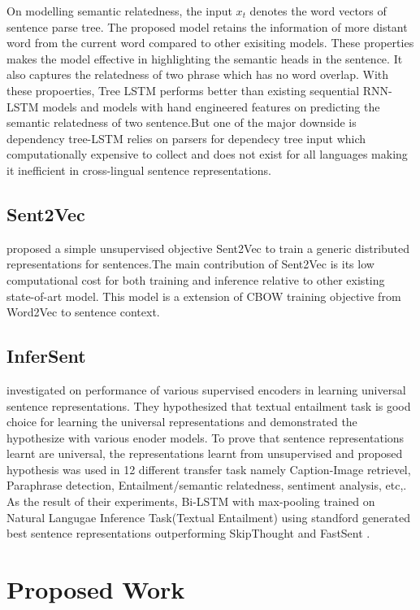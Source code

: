 \documentclass[12pt]{article} %
\begin{document}
On modelling semantic relatedness, the input $x_{t}$ denotes the word vectors of sentence parse tree. The proposed model retains the information of more distant word from the current word compared to other exisiting models. These properties makes the model effective in highlighting the semantic heads in the sentence. It also captures the relatedness of two phrase which has no word overlap. With these propoerties, Tree LSTM performs better than existing sequential RNN-LSTM models and models with hand engineered features on predicting the semantic relatedness of two sentence.But one of the major downside is dependency tree-LSTM relies on parsers for dependecy tree input which computationally expensive to collect and does not exist for all languages making it inefficient in cross-lingual sentence representations.

\subsection{Sent2Vec}
\cite{pagliardini2017unsupervised} proposed a simple unsupervised objective Sent2Vec to train a generic distributed representations for sentences.The main contribution of Sent2Vec is its low computational cost for both training and inference relative to other existing state-of-art model. This model is a extension of CBOW training objective from Word2Vec\cite{mikolov2014word2vec} to sentence context.

\subsection{InferSent}
\cite{conneau2017supervised} investigated on performance of various supervised encoders in learning universal sentence representations. They hypothesized that textual entailment task is good choice for learning the universal representations and demonstrated the hypothesize with various enoder models. To prove that sentence representations learnt are universal, the representations learnt from unsupervised and proposed hypothesis was used in 12 different transfer task namely Caption-Image retrievel, Paraphrase detection, Entailment/semantic relatedness, sentiment analysis, etc,. As the result of their experiments, Bi-LSTM with max-pooling trained on Natural Langugae Inference Task(Textual Entailment) using standford generated best sentence representations outperforming SkipThought \cite{kiros2015skip} and FastSent \cite{hill2016learning}.
 

\section{Proposed Work}
\end{document}
